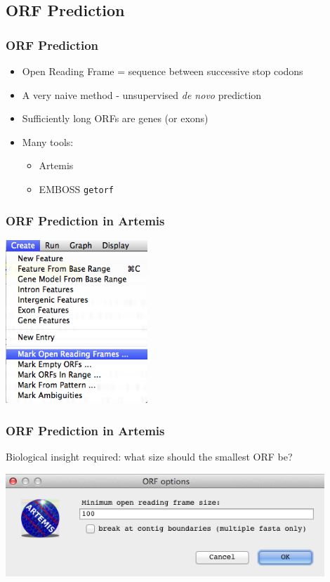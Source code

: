 \documentclass[table]{beamer}
\begin{document}
    \subsection{ORF Prediction}
    \begin{frame}
     \frametitle{ORF Prediction}
     \begin{itemize}
       \item Open Reading Frame = sequence between successive stop codons
       \item A very naive method - unsupervised \textit{de novo} prediction
       \item Sufficiently long ORFs are genes (or exons)
       \item Many tools:
       \begin{itemize}
         \item Artemis
         \item EMBOSS \texttt{getorf}
       \end{itemize}
     \end{itemize}
    \end{frame}

    \begin{frame}
      \frametitle{ORF Prediction in Artemis}    
      \begin{center}
        \includegraphics[width=0.4\textwidth]{images/artemis_orf0}     
      \end{center}
    \end{frame}

    \begin{frame}
      \frametitle{ORF Prediction in Artemis}
      Biological insight required: what size should the smallest ORF be?
      \begin{center}
        \includegraphics[width=0.9\textwidth]{images/artemis_orf1}     
      \end{center}
    \end{frame}
\end{document}
